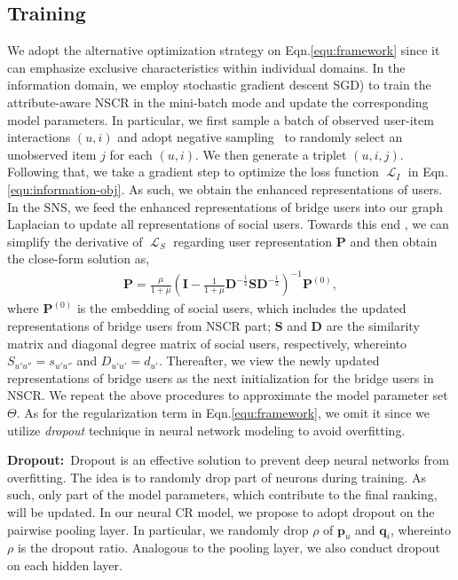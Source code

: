 \documentclass[sigconf]{acmart}
\newcommand{\Lapl}{\mathbf{\mathop{\mathcal{L}}}}
\newcommand{\Mat}[1]{\mathbf{#1}}
\begin{document}
\subsection{Training}
We adopt the alternative optimization strategy on Eqn.\eqref{equ:framework} since it can emphasize exclusive characteristics within individual domains. In the information domain, we employ stochastic gradient descent SGD) to train the attribute-aware NSCR in the mini-batch mode and update the corresponding model parameters. In particular, we first sample a batch of observed user-item interactions $(u, i)$ and adopt negative sampling~\cite{heneural} to randomly select an unobserved item $j$ for each $(u, i)$. We then generate a triplet $(u,i,j)$. Following that, we take a gradient step to optimize the loss function $\Lapl_{I}$ in Eqn.\eqref{equ:information-obj}. As such, we obtain the enhanced representations of users. In the SNS, we feed the enhanced representations of bridge users into our graph Laplacian to update all representations of social users. Towards this end , we can simplify the derivative of $\Lapl_{S}$ regarding user representation $\Mat{P}$ and then obtain the close-form solution as,
\begin{gather}\label{equ:social-training}
\Mat{P}=\frac{\mu}{1+\mu}\left(\Mat{I}-\frac{1}{1+\mu}\Mat{D}^{-\frac{1}{2}}\Mat{S}\Mat{D}^{-\frac{1}{2}}\right)^{-1}\Mat{P}^{(0)},
\end{gather}
where $\Mat{P}^{(0)}$ is the embedding of social users, which includes the updated representations of bridge users from NSCR part; $\Mat{S}$ and $\Mat{D}$ are the similarity matrix and diagonal degree matrix of social users, respectively, whereinto $S_{u'u''}=s_{u'u''}$ and $D_{u'u'}=d_{u'}$. Thereafter, we view the newly updated representations of bridge users as the next initialization for the bridge users in NSCR. We repeat the above procedures to approximate the model parameter set $\Theta$. As for the regularization term in Eqn.\eqref{equ:framework}, we omit it since we utilize \emph{dropout} technique in neural network modeling to avoid overfitting.



\textbf{Dropout:}~Dropout is an effective solution to prevent deep neural networks from overfitting. The idea is to randomly drop part of neurons during training. As such, only part of the model parameters, which contribute to the final ranking, will be updated. In our neural CR model, we propose to adopt dropout on the pairwise pooling layer. In particular, we randomly drop $\rho$ of $\Mat{p}_{u}$ and $\Mat{q}_{i}$, whereinto $\rho$ is the dropout ratio. Analogous to the pooling layer, we also conduct dropout on each hidden layer.
\end{document}

